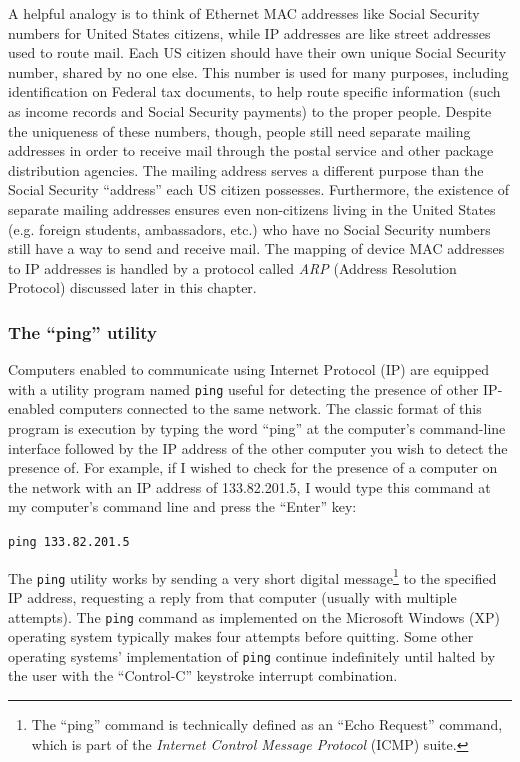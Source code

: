 A helpful analogy is to think of Ethernet MAC addresses like Social Security numbers for United States citizens, while IP addresses are like street addresses used to route mail.  Each US citizen should have their own unique Social Security number, shared by no one else.  This number is used for many purposes, including identification on Federal tax documents, to help route specific information (such as income records and Social Security payments) to the proper people.  Despite the uniqueness of these numbers, though, people still need separate mailing addresses in order to receive mail through the postal service and other package distribution agencies.  The mailing address serves a different purpose than the Social Security ``address'' each US citizen possesses.  Furthermore, the existence of separate mailing addresses ensures even non-citizens living in the United States (e.g. foreign students, ambassadors, etc.) who have no Social Security numbers still have a way to send and receive mail.  The mapping of device MAC addresses to IP addresses is handled by a protocol called \textit{ARP} (Address Resolution Protocol) discussed later in this chapter.    




\filbreak
\subsubsection{The ``ping'' utility}

Computers enabled to communicate using Internet Protocol (IP) are equipped with a utility program named \texttt{ping} useful for detecting the presence of other IP-enabled computers connected to the same network.  The classic format of this program is execution by typing the word ``ping'' at the computer's command-line interface followed by the IP address of the other computer you wish to detect the presence of.  For example, if I wished to check for the presence of a computer on the network with an IP address of 133.82.201.5, I would type this command at my computer's command line and press the ``Enter'' key:  

\vskip 10pt

\texttt{ping 133.82.201.5}

\vskip 10pt

The \texttt{ping} utility works by sending a very short digital message\footnote{The ``ping'' command is technically defined as an ``Echo Request'' command, which is part of the \textit{Internet Control Message Protocol} (ICMP) suite.} to the specified IP address, requesting a reply from that computer (usually with multiple attempts).  The \texttt{ping} command as implemented on the Microsoft Windows (XP) operating system typically makes four attempts before quitting.  Some other operating systems' implementation of \texttt{ping} continue indefinitely until halted by the user with the ``Control-C'' keystroke interrupt combination.        

